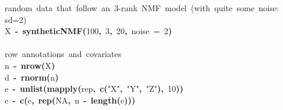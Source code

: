 \documentclass[a4paper]{article}\usepackage{graphicx, color}
\makeatletter
\newcommand{\hlnumber}[1]{\textcolor[rgb]{0,0,0}{#1}}%
\newcommand{\hlfunctioncall}[1]{\textcolor[rgb]{0.501960784313725,0,0.329411764705882}{\textbf{#1}}}%
\newcommand{\hlstring}[1]{\textcolor[rgb]{0.6,0.6,1}{#1}}%
\newcommand{\hlkeyword}[1]{\textcolor[rgb]{0,0,0}{\textbf{#1}}}%
\newcommand{\hlargument}[1]{\textcolor[rgb]{0.690196078431373,0.250980392156863,0.0196078431372549}{#1}}%
\newcommand{\hlcomment}[1]{\textcolor[rgb]{0.180392156862745,0.6,0.341176470588235}{#1}}%
\newcommand{\hlassignement}[1]{\textcolor[rgb]{0,0,0}{\textbf{#1}}}%
\newcommand{\hlsymbol}[1]{\textcolor[rgb]{0,0,0}{#1}}%
\newcommand{\hlstd}[1]{\textcolor[rgb]{0,0,0}{#1}}%
\newenvironment{kframe}{%
 \def\FrameCommand##1{\hskip\@totalleftmargin \hskip-\fboxsep
 \colorbox{shadecolor}{##1}\hskip-\fboxsep
     \hskip-\linewidth \hskip-\@totalleftmargin \hskip\columnwidth}%
 \MakeFramed {\advance\hsize-\width
   \@totalleftmargin\z@ \linewidth\hsize
   \@setminipage}}%
 {\par\unskip\endMakeFramed}
\newenvironment{knitrout}{}{} %
\makeatother
\begin{document}
\begin{knitrout}
\color{fgcolor}\begin{kframe}
\begin{flushleft}
\ttfamily\noindent
\hlcomment{\usebox{\hlnormalsizeboxhash}{\ }random{\ }data{\ }that{\ }follow{\ }an{\ }3-rank{\ }NMF{\ }model{\ }(with{\ }quite{\ }some{\ }noise:}\hspace*{\fill}\\
\hlstd{}\hlcomment{\usebox{\hlnormalsizeboxhash}{\ }sd=2)}\hspace*{\fill}\\
\hlstd{}\hlsymbol{X}{\ }\hlassignement{\usebox{\hlnormalsizeboxlessthan}-}{\ }\hlfunctioncall{syntheticNMF}\hlkeyword{(}\hlnumber{100}\hlkeyword{,}{\ }\hlnumber{3}\hlkeyword{,}{\ }\hlnumber{20}\hlkeyword{,}{\ }\hlargument{noise}{\ }\hlargument{=}{\ }\hlnumber{2}\hlkeyword{)}\hspace*{\fill}\\
\hlstd{}\hspace*{\fill}\\
\hlstd{}\hlcomment{\usebox{\hlnormalsizeboxhash}{\ }row{\ }annotations{\ }and{\ }covariates}\hspace*{\fill}\\
\hlstd{}\hlsymbol{n}{\ }\hlassignement{\usebox{\hlnormalsizeboxlessthan}-}{\ }\hlfunctioncall{nrow}\hlkeyword{(}\hlsymbol{X}\hlkeyword{)}\hspace*{\fill}\\
\hlstd{}\hlsymbol{d}{\ }\hlassignement{\usebox{\hlnormalsizeboxlessthan}-}{\ }\hlfunctioncall{rnorm}\hlkeyword{(}\hlsymbol{n}\hlkeyword{)}\hspace*{\fill}\\
\hlstd{}\hlsymbol{e}{\ }\hlassignement{\usebox{\hlnormalsizeboxlessthan}-}{\ }\hlfunctioncall{unlist}\hlkeyword{(}\hlfunctioncall{mapply}\hlkeyword{(}\hlsymbol{rep}\hlkeyword{,}{\ }\hlfunctioncall{c}\hlkeyword{(}\hlstring{"{}X"{}}\hlkeyword{,}{\ }\hlstring{"{}Y"{}}\hlkeyword{,}{\ }\hlstring{"{}Z"{}}\hlkeyword{)}\hlkeyword{,}{\ }\hlnumber{10}\hlkeyword{)}\hlkeyword{)}\hspace*{\fill}\\
\hlstd{}\hlsymbol{e}{\ }\hlassignement{\usebox{\hlnormalsizeboxlessthan}-}{\ }\hlfunctioncall{c}\hlkeyword{(}\hlsymbol{e}\hlkeyword{,}{\ }\hlfunctioncall{rep}\hlkeyword{(}\hlnumber{NA}\hlkeyword{,}{\ }\hlsymbol{n}{\ }\hlkeyword{-}{\ }\hlfunctioncall{length}\hlkeyword{(}\hlsymbol{e}\hlkeyword{)}\hlkeyword{)}\hlkeyword{)}\hspace*{\fill}\\

\end{flushleft}
\end{kframe}
\end{knitrout}
\end{document}
